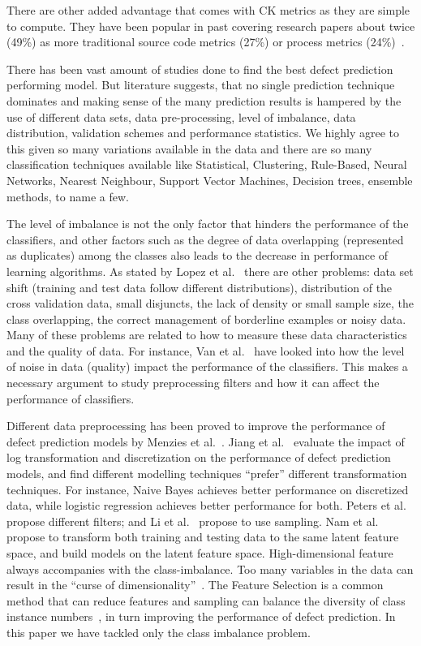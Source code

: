 \documentclass[sigconf,review, anonymous]{acmart}
\theoremstyle{break}
\theoremstyle{break}
\begin{document}
There are other added advantage that comes with CK metrics as they are  simple  to  compute. They have been popular in past covering research papers about twice (49\%) 
as more traditional source code metrics (27\%) or process metrics (24\%)~\cite{radjenovic2013software}. 

There has been vast amount of studies done to find the best defect prediction performing model. But literature suggests, that no single prediction technique dominates and making sense of the many prediction results is hampered by the use of different data sets, data pre-processing, level of imbalance, data distribution, validation schemes and performance
statistics. We highly agree to this given so many variations available in the data 
and there are so many classification techniques available like Statistical, Clustering, Rule-Based, Neural Networks, Nearest Neighbour, Support Vector Machines, Decision trees, ensemble methods, to name a few.

The level of imbalance is not the only factor that hinders
the performance of the classifiers, and other factors
such as the degree of data overlapping (represented
as duplicates) among the classes also leads to the decrease in performance of
learning algorithms. As stated by Lopez et al.~\cite{lopez2014importance,lopez2012analysis} there
are other problems: data set shift (training and test
data follow different distributions), distribution of the
cross validation data, small disjuncts, the lack of density
or small sample size, the class overlapping, the
correct management of borderline examples or noisy
data. Many of these problems are related to how to
measure these data characteristics and the quality of
data. For instance, Van et al.~\cite{van2009knowledge}
have looked into how the level of noise in data (quality) impact the performance of the classifiers. This makes a necessary argument to study preprocessing filters and how it can affect the performance of classifiers. 

Different data preprocessing has been proved
to improve the performance of defect prediction models by
Menzies et al.~\cite{menzies2007data}. Jiang et al.~\cite{jiang2008can} evaluate the impact of
log transformation and discretization on the performance
of defect prediction models, and find different modelling
techniques ``prefer'' different transformation techniques. For
instance, Naive Bayes achieves better performance on discretized
data, while logistic regression achieves better performance
for both. Peters et al.~\cite{peters2013better} propose different filters; and Li et al.~\cite{li2012sample} propose
to use sampling. Nam et al.~\cite{nam2013transfer} propose to transform both
training and testing data to the same latent feature space,
and build models on the latent feature space.  High-dimensional feature always accompanies with the class-imbalance. Too many variables in the data
can result in the ``curse of dimensionality''~\cite{friedman1997bias}. The Feature Selection is a common method that can
reduce features and sampling can balance the diversity of
class instance numbers~\cite{yin2015empirical}, in turn improving the performance of defect prediction. In this paper we have tackled only the class imbalance problem.
\end{document}

